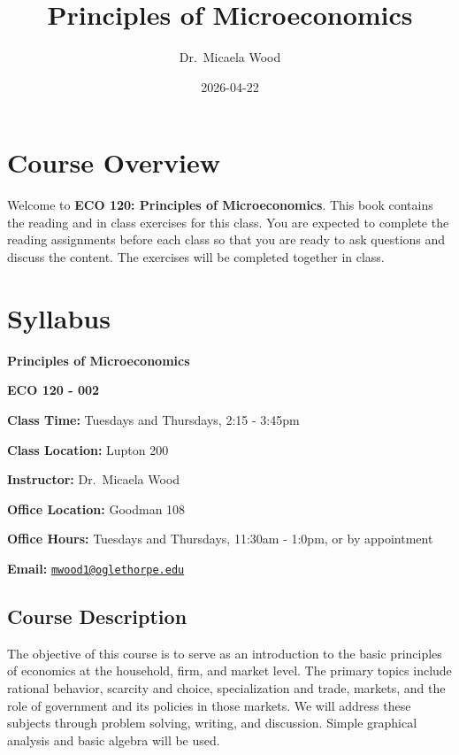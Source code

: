 \documentclass[
]{book}
\title{Principles of Microeconomics}
\author{Dr.~Micaela Wood}
\date{2026-04-22}
\begin{document}
\maketitle

{
\setcounter{tocdepth}{1}
\tableofcontents
}
\chapter*{Course Overview}\label{course-overview}

Welcome to \textbf{ECO 120: Principles of Microeconomics}. This book contains the reading and in class exercises for this class. You are expected to complete the reading assignments before each class so that you are ready to ask questions and discuss the content. The exercises will be completed together in class.

\chapter*{Syllabus}\label{syllabus}

\textbf{Principles of Microeconomics}

\textbf{ECO 120 - 002}

\textbf{Class Time:} Tuesdays and Thursdays, 2:15 - 3:45pm

\textbf{Class Location:} Lupton 200

\textbf{Instructor:} Dr.~Micaela Wood

\textbf{Office Location:} Goodman 108

\textbf{Office Hours:} Tuesdays and Thursdays, 11:30am - 1:0pm, or by appointment

\textbf{Email:} \href{mailto:mwood1@oglethorpe.edu}{\nolinkurl{mwood1@oglethorpe.edu}}

\section*{Course Description}\label{course-description}

The objective of this course is to serve as an introduction to the basic principles of economics at the household, firm, and market level. The primary topics include rational behavior, scarcity and choice, specialization and trade, markets, and the role of government and its policies in those markets. We will address these subjects through problem solving, writing, and discussion. Simple graphical analysis and basic algebra will be used.
\end{document}
